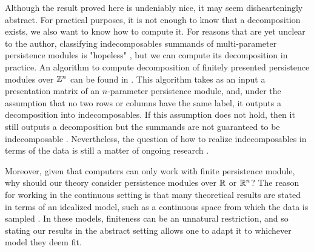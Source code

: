 Although the result proved here is undeniably nice, it may seem dishearteningly abstract.
For practical purposes, it is not enough to know that a decomposition exists, we also want to know how to compute it.
For reasons that are yet unclear to the author, classifying indecomposables summands of multi-parameter persistence modules is "hopeless" \cite[Section 8.5]{botnanLesnick_2022}, but we can compute its decomposition in practice.
An algorithm to compute decomposition of finitely presented persistence modules over $\mathbb{Z}^n$ can be found in \cite{deyXin_2019}. 
This algorithm takes as an input a presentation matrix of an $n$-parameter persistence module, and, under the assumption that no two rows or columns have the same label, it outputs a decomposition into indecomposables.
If this assumption does not hold, then it still outputs a decomposition but the summands are not guaranteed to be indecomposable \cite[Section 8.5]{botnanLesnick_2022}.
Nevertheless, the question of how to realize indecomposables in terms of the data is still a matter of ongoing research \cite{botnanLesnick_2022}.

Moreover, given that computers can only work with finite persistence module, why should our theory consider persistence modules over $\mathbb{R}$ or $\mathbb{R}^n$?
The reason for working in the continuous setting is that many theoretical results are stated in terms of an idealized model, such as a continuous space from which the data is sampled \cite{chazalSilva_2012}.
In these models, finiteness can be an unnatural restriction, and so stating our results in the abstract setting allows one to adapt it to whichever model they deem fit. 